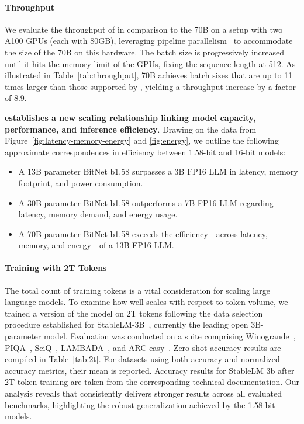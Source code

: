 \paragraph{Throughput}

We evaluate the throughput of  in comparison to the  70B on a setup with two A100 GPUs (each with 80GB), leveraging pipeline parallelism~\cite{gpipe} to accommodate the size of the  70B on this hardware. The batch size is progressively increased until it hits the memory limit of the GPUs, fixing the sequence length at 512. As illustrated in Table~\ref{tab:throughput},  70B achieves batch sizes that are up to 11 times larger than those supported by , yielding a throughput increase by a factor of 8.9.

\textbf{ establishes a new scaling relationship linking model capacity, performance, and inference efficiency}. Drawing on the data from Figure~\ref{fig:latency-memory-energy} and \ref{fig:energy}, we outline the following approximate correspondences in efficiency between 1.58-bit and 16-bit models:

\begin{itemize}
    \item A 13B parameter BitNet b1.58 surpasses a 3B FP16 LLM in latency, memory footprint, and power consumption.
    \item A 30B parameter BitNet b1.58 outperforms a 7B FP16 LLM regarding latency, memory demand, and energy usage.
    \item A 70B parameter BitNet b1.58 exceeds the efficiency—across latency, memory, and energy—of a 13B FP16 LLM.
\end{itemize}

\paragraph{Training with 2T Tokens}

The total count of training tokens is a vital consideration for scaling large language models. To examine how well  scales with respect to token volume, we trained a version of the model on 2T tokens following the data selection procedure established for StableLM-3B~\cite{StableLM-3B-4E1T}, currently the leading open 3B-parameter model. Evaluation was conducted on a suite comprising Winogrande~\cite{winoGrande}, PIQA~\cite{piqa}, SciQ~\cite{sciq}, LAMBADA~\cite{lambada}, and ARC-easy~\cite{arc}. Zero-shot accuracy results are compiled in Table~\ref{tab:2t}. For datasets using both accuracy and normalized accuracy metrics, their mean is reported. Accuracy results for StableLM 3b after 2T token training are taken from the corresponding technical documentation. Our analysis reveals that  consistently delivers stronger results across all evaluated benchmarks, highlighting the robust generalization achieved by the 1.58-bit models.

